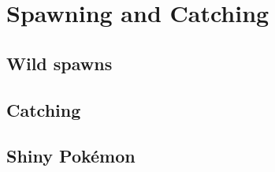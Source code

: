 \chapter{Spawning and Catching}
\label{chap:spawn}

\section{Wild spawns}
\label{section:spawns}

\section{Catching}
\label{section:catch}

\section{Shiny Pokémon}
\label{section:shiny}
